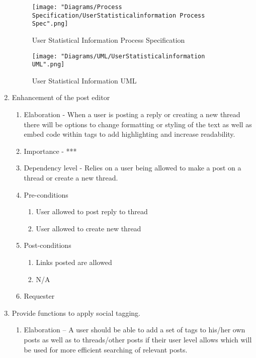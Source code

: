 \documentclass[12pt]{article}
\begin{document}
\begin{enumerate}
\begin{figure}[h]
  	\centering
  	\texttt{[image: "Diagrams/Process Specification/UserStatisticalinformation Process Spec".png]}
  	\caption{User Statistical Information Process Specification}
  \end{figure}
     \begin{figure}[h]
     	\centering
     	\texttt{[image: "Diagrams/UML/UserStatisticalinformation UML".png]}
     	\caption{User Statistical Information UML}
     \end{figure}
\clearpage %
   \item Enhancement of the post editor %
  \begin{enumerate}
    \item Elaboration - When a user is posting a reply or creating a new thread there will be options to change formatting or styling of the text as well as embed code within tags to add highlighting and increase readability.
    \item Importance - ***
    \item Dependency level - Relies on a user being allowed to make a post on a thread or create a new thread.
    \item Pre-conditions
    \begin{enumerate}
    	\item User allowed to post reply to thread
    	\item User allowed to create new thread
    \end{enumerate}
        \item Post-conditions
    \begin{enumerate}
    	\item Links posted are allowed
    	\item N/A
    \end{enumerate}
    \item Requester
  \end{enumerate}
\clearpage %
   \item  Provide functions to apply social tagging. %
  \begin{enumerate}
    \item Elaboration – A user should be able to add a set of tags to his/her own posts as well as to threads/other posts if their user level allows which will be used for more efficient searching of relevant posts. 

\end{enumerate}
\end{enumerate}
\end{document}
